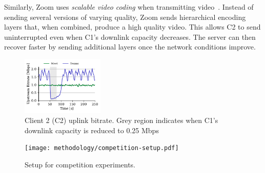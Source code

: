 Similarly, Zoom uses \textit{scalable video coding} when transmitting
video~\cite{zoom_encoding}. Instead of sending several versions of varying
quality, Zoom sends hierarchical encoding layers that, when combined,
produce a high quality video. This allows C2 to send uninterrupted
even when C1's downlink capacity decreases. The server can then recover faster
by sending additional layers once the network conditions improve.  

\begin{figure}[t]
    \centering
    \includegraphics[width=0.35\textwidth,keepaspectratio]{../figures/interrupt/Interrupt-sender.pdf}
    \caption{Client 2 (C2) uplink bitrate. Grey region indicates when C1's downlink capacity is reduced to 0.25 Mbps}
    \label{fig:interrupt-sender}
\end{figure}

\begin{figure}[]
   \centering
    \texttt{[image: methodology/competition-setup.pdf]}
    \caption{Setup for competition experiments.}
    \label{fig:competition-setup}
\end{figure}


